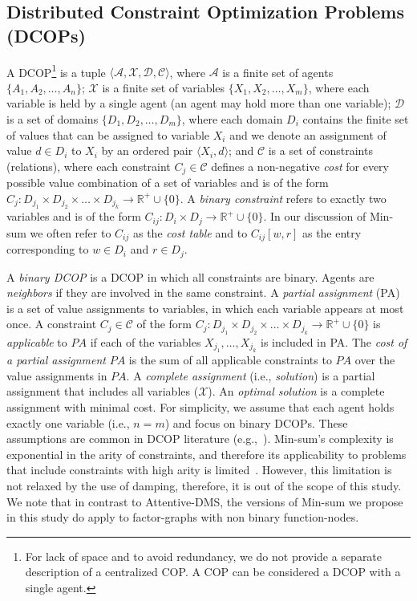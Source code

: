 \documentclass[letterpaper]{article} %
\theoremstyle{definition}
\theoremstyle{remark}
\begin{document}
\subsection{Distributed Constraint Optimization Problems (DCOPs)}
\label{Sec:DCOP_defs}
\sloppy
A DCOP\footnote{For lack of space and to avoid redundancy, we do not provide a separate description of a centralized COP. A COP can be considered a DCOP with a single agent.} is a tuple $\langle{\mathcal A},{\mathcal X},{\mathcal D},{\mathcal C}\rangle$, where ${\mathcal A}$ is a finite set of agents $\{ A_1,A_2,\ldots,A_n \}$; ${\mathcal X}$ is a finite set of variables $\{ X_1,X_2,\ldots,X_m \}$, where each variable is held by a single agent (an agent may hold more than one variable); ${\mathcal D}$ is a set of domains $\{ D_1, D_2,\ldots,D_m \}$, where each domain $D_i$ contains the finite set of values that can be assigned to variable $X_i$ and we denote an assignment of value $d \in D_i$ to $X_i$ by an ordered pair $\langle X_i, d \rangle$; and ${\mathcal C}$ is a set of constraints (relations), where each constraint $C_j \in {\mathcal C}$ defines a non-negative {\em cost} for every possible value combination of a set of variables and is of the form $C_j : D_{j_1} \times D_{j_2} \times \ldots \times D_{j_k} \rightarrow \mathbb{R}^+ \cup \{0\}$. A {\em binary constraint} refers to exactly two variables and is of the form $C_{ij} : D_i \times D_j \rightarrow \mathbb{R}^+ \cup \{0\}$.
In our discussion of Min-sum we often refer to $C_{ij}$ as the {\em cost table} and to $C_{ij}[w,r]$ as the entry corresponding to $w \in D_i$ and $r \in D_j$.

A {\em binary DCOP} is a DCOP in which all constraints are binary. Agents are {\em neighbors} if they are involved in the same constraint. A {\em partial assignment} (PA) is a set of value assignments to variables, in which each variable appears at most once. A constraint $C_j \in {\mathcal C}$ of the form $C_j : D_{j_1} \times D_{j_2} \times \ldots \times D_{j_k} \rightarrow \mathbb{R}^+ \cup \{0\}$ is {\em applicable} to $PA$ if each of the variables $X_{j_1} , \ldots , X_{j_k}$ is included in PA. The {\em cost of a partial assignment} $PA$ is the sum of all applicable constraints to $PA$ over the value assignments in $PA$. A {\em complete assignment} (i.e., {\em solution}) is a partial assignment that includes all variables ($\mathcal X$). An {\em optimal solution} is a complete assignment with minimal cost.
For simplicity, we assume that each agent holds exactly one variable (i.e., $n=m$) and focus on binary DCOPs. These assumptions are common in DCOP literature (e.g.,~\cite{Petcu05b,YeohFK10}).
Min-sum's complexity is exponential in the arity of constraints, and therefore its applicability to problems that include constraints with high arity is limited~\cite{FarinelliRPJ08,YedidsionZF18}. However, this limitation is not relaxed by the use of damping, therefore, it is out of the scope of this study. We note that in contrast to Attentive-DMS, the versions of Min-sum we propose in this study do apply to factor-graphs with non binary function-nodes.
\end{document}
